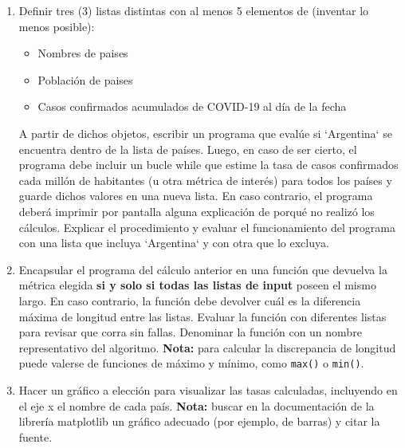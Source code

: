 \documentclass[a4paper,11pt]{article}
\begin{document}
\begin{enumerate}
		\item Definir tres (3) listas distintas con al menos 5 elementos de (inventar lo menos posible):
		    \begin{itemize}
		        \item Nombres de paises
		        \item Población de paises
		        \item Casos confirmados acumulados de COVID-19 al día de la fecha  
		    \end{itemize}
        A partir de dichos objetos, escribir un programa que evalúe si `Argentina` se encuentra dentro de la lista de países. Luego, en caso de ser cierto, el programa debe incluir un bucle while que estime la tasa de casos confirmados cada millón de habitantes (u otra métrica de interés) para todos los países y guarde dichos valores en una nueva lista. En caso contrario, el programa deberá imprimir por pantalla alguna explicación de porqué no realizó los cálculos. Explicar el procedimiento y evaluar el funcionamiento del programa con una lista que incluya `Argentina` y con otra que lo excluya.
        \item Encapsular el programa del cálculo anterior en una función que devuelva la métrica elegida \textbf{si y solo si todas las listas de input} poseen el mismo largo. En caso contrario, la función debe devolver cuál es la diferencia máxima de longitud entre las listas. Evaluar la función con diferentes listas para revisar que corra sin fallas. Denominar la función con un nombre representativo del algoritmo. \textbf{Nota:} para calcular la discrepancia de longitud puede valerse de funciones de máximo y mínimo, como \texttt{max()} o \texttt{min()}.
        \item Hacer un gráfico a elección para visualizar las tasas calculadas, incluyendo en el eje x el nombre de cada país. \textbf{Nota:} buscar en la documentación de la librería matplotlib un gráfico adecuado (por ejemplo, de barras) y citar la fuente.

\end{enumerate}
\end{document}
